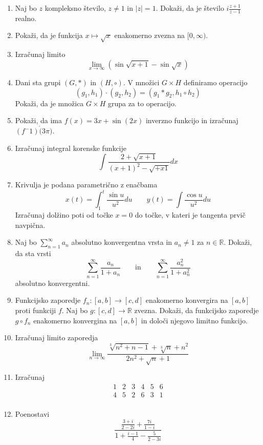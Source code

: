 \documentclass[a4paper,12pt]{article}
\begin{document}
\begin{enumerate}
\item Naj bo $z$ kompleksno število, $z \ne 1$ in $\lvert z \rvert =1$.
Dokaži, da je število $i \frac{z+1}{z-1}$ realno.

\item Pokaži, da je funkcija $x \mapsto \sqrt{x}$ enakomerno zvezna na $[0,\infty)$.

\item Izračunaj limito
$$\lim_{x\to\infty}(\sin{\sqrt{x+1}}-\sin{\sqrt{x}})$$

\item Dani sta grupi $(G,*)$ in $(H,\circ)$. V množici $G\times H$ definiramo operacijo
\[
(g_1 , h_1) \cdot (g_2 , h_2)=(g_1 * g_2 , h_1 \circ h_2)    
\]
Pokaži, da je množica $G\times H$ grupa za to operacijo.

\item Pokaži, da ima $f(x)=3x+\sin(2x)$ inverzno funkcijo in izračunaj $(f^-1)\acute(3\pi)$.

\item Izračunaj integral korenske funkcije
\[
\int{\frac{2+\sqrt{x+1}}{(x+1)^2 - \sqrt{+x1}}dx}    
\]
\item Krivulja je podana parametrično z enačbama
\[
x(t)=\int_1^t{\frac{\sin{u}}{u^2}}du \qquad y(t)=\int{\frac{\cos{u}}{u^2}du}    
\]
Izračunaj dolžino poti od točke $x=0$ do točke, v kateri je tangenta prvič navpična.

\item Naj bo $\sum_{n=1}^{\infty} {a_n}$ absolutno konvergentna vrsta in $a_n \ne 1$ za $n \in \mathbb{R}$.
Dokaži, da sta vrsti
\[
\sum^{\infty}_{n=1}{\frac{a_n}{1+a_n}}\qquad \text{in} \qquad \sum^{\infty}_{n=1}{\frac{a^2_n}{1+a^2_n}}   
\]
absolutno konvergentni.

\item Funkcijsko zaporedje $f_n:[a,b]\rightarrow [c,d]$ enakomerno konvergira na $[a,b]$ proti funkciji $f$.
Naj bo $g:[c,d]\rightarrow \mathbb{R}$ zvezna. Dokaži, da funkcijsko zaporedje $g\circ f_n$
enakomerno konvergina na $[a,b]$ in določi njegovo limitno funkcijo.

\item Izračunaj limito zaporedja
\[
\lim_{n\rightarrow \infty}{\frac{\sqrt[3]{n^2+n-1}+\sqrt[3]{n}+n^2}{2n^2+\sqrt{n}+1}}    
\]

\item Izračunaj
\[
\begin{matrix}
1 & 2 & 3 & 4 & 5 & 6 \\ 
4 & 5 & 2 & 6 & 3 & 1 \\ 
\end{matrix}
\]
\item Poenostavi
\[
\frac{\frac{3+i}{2-2i}+\frac{7i}{1-i}}{1+\frac{i-1}{4}-\frac{5}{2-3i}}    
\]


\end{enumerate}
\end{document}
